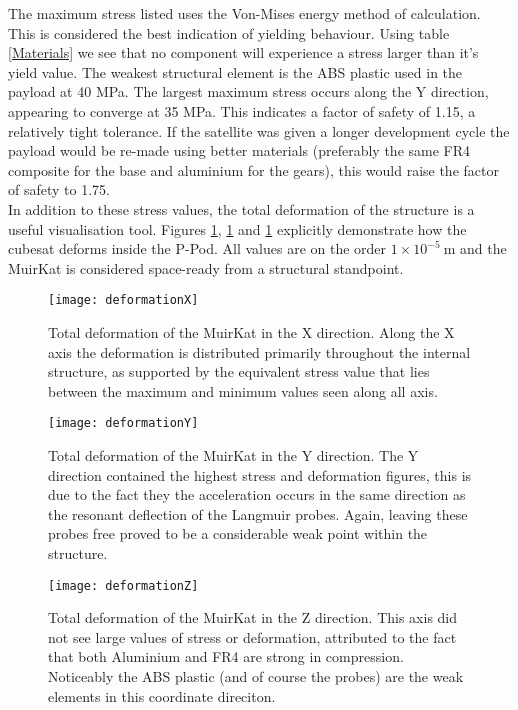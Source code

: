 The maximum stress listed uses the Von-Mises energy method of calculation. This is considered the best indication of yielding behaviour. Using table \ref{Materials} we see that no component will experience a stress larger than it's yield value. The weakest structural element is the ABS plastic used in the payload at 40 MPa. The largest maximum stress occurs along the Y direction, appearing to converge at 35 MPa. This indicates a factor of safety of 1.15, a relatively tight tolerance. If the satellite was given a longer development cycle the payload would be re-made using better materials (preferably the same FR4 composite for the base and aluminium for the gears), this would raise the factor of safety to 1.75. \\

In addition to these stress values, the total deformation of the structure is a useful visualisation tool. Figures \ref{fig:defX}, \ref{fig:defX} and \ref{fig:defX} explicitly demonstrate how the cubesat deforms inside the P-Pod. All values are on the order $1\times 10^{-5} \ \text{m}$ and the MuirKat is considered space-ready from a structural standpoint. 

\begin{figure}[H]
\centering	
\texttt{[image: deformationX]}
\caption{Total deformation of the MuirKat in the X direction. Along the X axis the deformation is distributed primarily throughout the internal structure, as supported by the equivalent stress value that lies between the maximum and minimum values seen along all axis.}
\label{fig:defX}
\end{figure}

\begin{figure}[H]
\centering	
\texttt{[image: deformationY]}
\caption{Total deformation of the MuirKat in the Y direction. The Y direction contained the highest stress and deformation figures, this is due to the fact they the acceleration occurs in the same direction as the resonant deflection of the Langmuir probes. Again, leaving these probes free proved to be a considerable weak point within the structure.}
\label{fig:defY}
\end{figure}

\begin{figure}[H]
\centering	
\texttt{[image: deformationZ]}
\caption{Total deformation of the MuirKat in the Z direction. This axis did not see large values of stress or deformation, attributed to the fact that both Aluminium and FR4 are strong in compression. Noticeably the ABS plastic (and of course the probes) are the weak elements in this coordinate direciton.}
\label{fig:defZ}
\end{figure}
